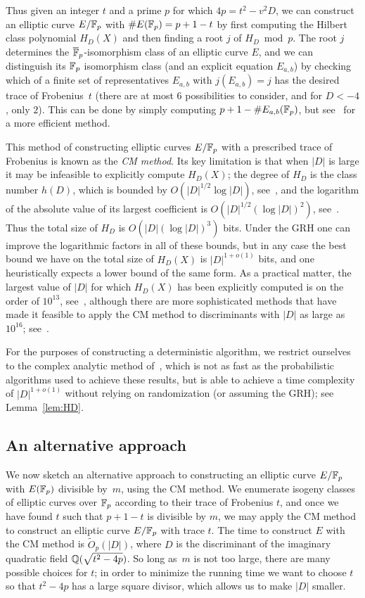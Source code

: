 \documentclass[12pt]{amsart}
\begin{document}
Thus given an integer $t$ and a prime $p$ for which $4p=t^2-v^2D$, we can construct an elliptic curve $E/\mathbb{F}_p$ with $\#E(\mathbb{F}_p)=p+1-t$ by first computing the  Hilbert class polynomial $H_D(X)$ and then finding a root $j$ of $H_D\bmod p$.
The root $j$ determines the $\overline{\mathbb{F}}_p$-isomorphism class of an elliptic curve $E$, and we can distinguish its $\mathbb{F}_p$ isomorphism class (and an explicit equation $E_{a,b}$) by checking which of a finite set of representatives $E_{a,b}$ with $j(E_{a,b})=j$ has the desired trace of Frobenius~$t$ (there are at most 6 possibilities to consider, and for $D<-4$, only $2$).
This can be done by simply computing $p+1-\#E_{a,b}(\mathbb{F}_p)$, but see~\cite{RS} for a more efficient method.

This method of constructing elliptic curves $E/\mathbb{F}_p$ with a prescribed trace of Frobenius is known as the \emph{CM method}.
Its key limitation is that when $|D|$ is large it may be infeasible to explicitly compute $H_D(X)$; the degree of $H_D$ is the class number $h(D)$, which is bounded by $O(|D|^{1/2}\log|D|)$,
see~\cite{Schur}, and the logarithm of the absolute value of its largest coefficient is $O(|D|^{1/2}(\log|D|)^2)$, see~\cite[Lemma 8]{Sut2}.
Thus the total size of $H_D$ is $O(|D|(\log|D|)^3)$ bits.
Under the GRH one can improve the logarithmic factors in all of these bounds, but in any case the best bound we have on the total size of $H_D(X)$ is $|D|^{1+o(1)}$ bits, and one heuristically expects a lower bound of the same form.
As a practical matter, the largest value of $|D|$ for which $H_D(X)$ has been explicitly computed is on the order of $10^{13}$, see~\cite{Sut2}, although there are more sophisticated methods that have made it feasible to apply the CM method to discriminants with $|D|$ as large as $10^{16}$; 
see~\cite{ES,Sut3}.

For the purposes of constructing a deterministic algorithm, we restrict ourselves to the complex analytic method of~\cite{Enge}, which is not as fast as the probabilistic algorithms used to achieve these results, but is able to achieve a time complexity of $|D|^{1+o(1)}$ without relying on randomization (or assuming the GRH); see Lemma~\ref{lem:HD}.

\subsection{An alternative approach}\label{sec:alt}

We now sketch an alternative approach to constructing an elliptic curve $E/\mathbb{F}_p$ with $E(\mathbb{F}_p)$ divisible by~$m$, using the CM method.
We enumerate isogeny classes of elliptic curves over $\mathbb{F}_p$ according to their trace of Frobenius $t$, and once we have found $t$ such that $p+1-t$ is divisible by $m$, we may apply the CM method to construct an elliptic curve $E/\mathbb{F}_p$ with trace $t$.
The time to construct $E$ with the CM method is $\widetilde{O}_p(|D|)$, where $D$ is the discriminant of the imaginary quadratic field $\mathbb{Q}(\sqrt{t^2-4p})$.
So long as~$m$ is not too large, there are many possible choices for $t$; in order to minimize the running time we want to choose $t$ so that $t^2-4p$ has a large square divisor, which allows us to make $|D|$ smaller.
\end{document}
